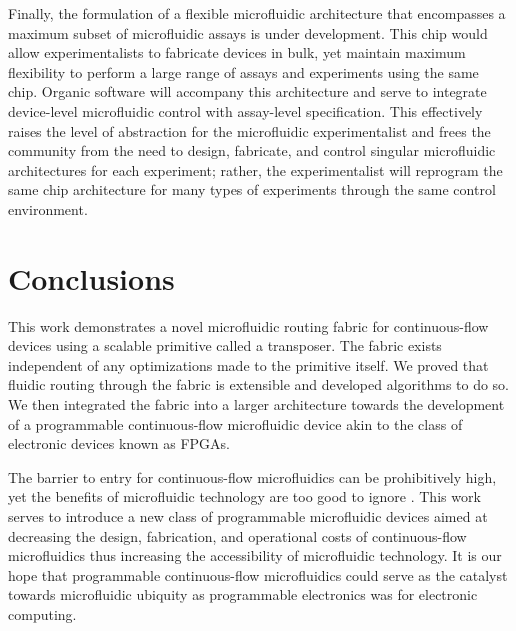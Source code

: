 Finally, the formulation of a flexible microfluidic architecture that encompasses a maximum subset of microfluidic assays is under development. This chip would allow experimentalists to fabricate devices in bulk, yet maintain maximum flexibility to perform a large range of assays and experiments using the same chip. Organic software will accompany this architecture and serve to integrate device-level microfluidic control with assay-level specification. This effectively raises the level of abstraction for the microfluidic experimentalist and frees the community from the need to design, fabricate, and control singular microfluidic architectures for each experiment; rather, the experimentalist will reprogram the same chip architecture for many types of experiments through the same control environment.

\section{Conclusions}
This work demonstrates a novel microfluidic routing fabric for continuous-flow devices using a scalable primitive called a transposer. The fabric exists independent of any optimizations made to the primitive itself. We proved that fluidic routing through the fabric is extensible and developed algorithms to do so. We then integrated the fabric into a larger architecture towards the development of a programmable continuous-flow microfluidic device akin to the class of electronic devices known as FPGAs. 

The barrier to entry for continuous-flow microfluidics can be prohibitively high, yet the benefits of microfluidic technology are too good to ignore \cite{whitesides2006}. This work serves to introduce a new class of programmable microfluidic devices aimed at decreasing the design, fabrication, and operational costs of continuous-flow microfluidics thus increasing the accessibility of microfluidic technology. It is our hope that programmable continuous-flow microfluidics could serve as the catalyst towards microfluidic ubiquity as programmable electronics was for electronic computing.
